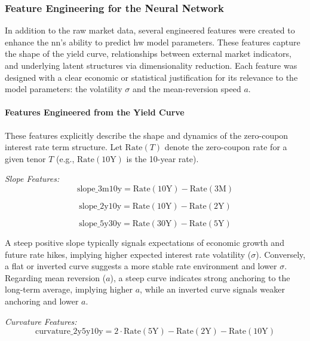 \subsubsection{Feature Engineering for the Neural Network}
In addition to the raw market data, several engineered features were created to enhance the \ac{nn}'s ability to predict \ac{hw} model parameters. These features capture the shape of the yield curve, relationships between external market indicators, and underlying latent structures via dimensionality reduction. Each feature was designed with a clear economic or statistical justification for its relevance to the model parameters: the volatility \(\sigma\) and the mean-reversion speed \(a\).

\paragraph{Features Engineered from the Yield Curve}
These features explicitly describe the shape and dynamics of the zero-coupon interest rate term structure. Let \(\text{Rate}(T)\) denote the zero-coupon rate for a given tenor \(T\) (e.g., \(\text{Rate}(10\text{Y})\) is the 10-year rate).

\textit{Slope Features:}
\begin{equation}
	\text{slope\_3m10y} = \text{Rate}(10\text{Y}) - \text{Rate}(3\text{M})
\end{equation}

\begin{equation}
	\text{slope\_2y10y} = \text{Rate}(10\text{Y}) - \text{Rate}(2\text{Y})
\end{equation}

\begin{equation}
	\text{slope\_5y30y} = \text{Rate}(30\text{Y}) - \text{Rate}(5\text{Y})
\end{equation}

A steep positive slope typically signals expectations of economic growth and future rate hikes, implying higher expected interest rate volatility (\(\sigma\)). Conversely, a flat or inverted curve suggests a more stable rate environment and lower \(\sigma\). Regarding mean reversion (\(a\)), a steep curve indicates strong anchoring to the long-term average, implying higher \(a\), while an inverted curve signals weaker anchoring and lower \(a\).

\textit{Curvature Features:}
\begin{equation}
	\text{curvature\_2y5y10y} = 2 \cdot \text{Rate}(5\text{Y}) - \text{Rate}(2\text{Y}) - \text{Rate}(10\text{Y})
\end{equation}

